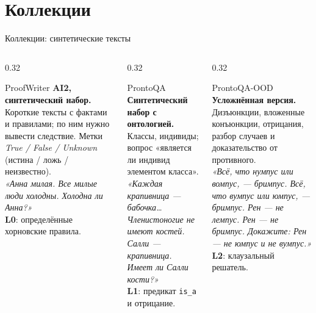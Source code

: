 \documentclass[aspectratio=169,11pt]{beamer}
\begin{document}
\section{Коллекции}

\begin{frame}[shrink=4]{Коллекции: синтетические тексты}
  \footnotesize
  \begin{columns}[T,onlytextwidth]
    \begin{column}{0.32\textwidth}
      \begin{block}{ProofWriter}
        \textbf{AI2, синтетический набор.} Короткие тексты с фактами и
        правилами; по ним нужно вывести следствие. Метки
        \textit{True / False / Unknown} (истина / ложь / неизвестно).\\
        \textit{«Анна милая. Все милые люди холодны.
        Холодна ли Анна?»}\\[1mm]
        \textbf{L0}: определённые хорновские правила.
      \end{block}
    \end{column}
    \begin{column}{0.32\textwidth}
      \begin{block}{ProntoQA}
        \textbf{Синтетический набор с онтологией.} Классы, индивиды; вопрос
        «является ли индивид элементом класса».\\
        \textit{«Каждая крапивница — бабочка… Членистоногие не имеют
        костей. Салли — крапивница. Имеет ли Салли кости?»}\\[1mm]
        \textbf{L1}: предикат \texttt{is\_a} и отрицание.
      \end{block}
    \end{column}
    \begin{column}{0.32\textwidth}
      \begin{block}{ProntoQA-OOD}
        \textbf{Усложнённая версия.} Дизъюнкции, вложенные конъюнкции,
        отрицания, разбор случаев и доказательство от противного.\\
        \textit{«Всё, что нумпус или вомпус, — бримпус. Всё, что вумпус
        или юмпус, — бримпус. Рен — не лемпус. Рен — не бримпус.
        Докажите: Рен — не юмпус и не вумпус.»}\\[1mm]
        \textbf{L2}: клаузальный решатель.
      \end{block}
    \end{column}
  \end{columns}
\end{frame}
\end{document}
